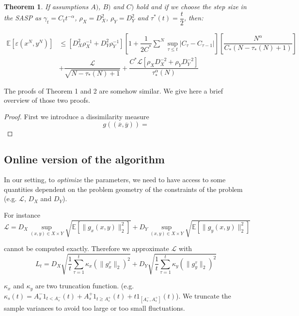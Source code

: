 \documentclass[12pt,reqno]{amsart}
\newtheorem{thm}{Theorem}[section]
\numberwithin{equation}{section}
\begin{document}
\begin{thm}
If assumptions $A)$, $B)$ and $C)$ hold and if we choose the step size in the SASP as $\gamma_{t} = C_{t}t^{-\alpha}$,
$\rho_{X} = D_{X}^{2}$, $\rho_{Y} = D_{Y}^{2}$ and $\tau^{*}(t) = \dfrac{t}{2}$, then:

\begin{align*}
\mathbb{E}[\varepsilon(x^{N},y^{N})] &\leq [D_{X}^{2}\rho_{X}^{-1} + D_{Y}^{2}\rho_{Y}^{-1} ][1 + \dfrac{1}{2C^{*}}\sum_{}^{N}\sup_{\tau \leq t} | C_{\tau} - C_{\tau-1}|]
[\dfrac{N^{\alpha}}{C_{*}(N - \tau_{*}(N) + 1)}] \\ 
&+ \dfrac{\mathcal{L}}{\sqrt{N - \tau_{*}(N)+ 1}} + \dfrac{C^{*}\mathcal{L}[\rho_{X}D_{X}^{-2} + \rho_{Y}D_{Y}^{-2}]}{\tau_{*}^{\alpha}(N)}
\end{align*}
\end{thm}


The proofs of Theorem 1 and 2 are somehow similar.
We give here a brief overview of those two proofs.

\begin{proof}

First we introduce a dissimilarity measure
$$
g((\overline{x},\overline{y})) = 
$$

\end{proof}

\subsection{Online version of the algorithm}

In our setting, to \emph{optimize} the parameters, we need to have access to some quantities dependent on the problem geometry of the constraints of the problem (e.g. $\mathcal{L}$, $D_{X}$ and $D_{Y}$).

For instance
$$
\mathcal{L} = D_{X} \sup_{(x,y) \in X \times Y} \sqrt{\mathbb{E}[\lVert g_{x}(x,y) \rVert_{2}^{2}]} + 
D_{Y} \sup_{(x,y) \in X \times Y} \sqrt{\mathbb{E}[\lVert g_{y}(x,y) \rVert_{2}^{2}]}
$$

cannot be computed exactly.
Therefore we approximate $\mathcal{L}$ with  
$$
L_{t} = D_{X}\sqrt{\dfrac{1}{t}\sum_{\tau=1}^{t}\kappa_{x}(\lVert g_{x}^{\tau} \rVert_{2})^{2}} + D_{Y}\sqrt{\dfrac{1}{t}\sum_{\tau=1}^{t}  \kappa_{y}(\lVert g_{y}^{\tau} \rVert_{2})^{2}}
$$

$\kappa_{x}$ and $\kappa_{y}$ are two truncation function.
(e.g. $\kappa_{s}(t) = A_{s}^{-}1_{ t < A_{s}^{-}}(t) + A_{s}^{+}1_{ t \geq A_{s}^{+}}(t) + t 1_{ [A_{s}^{-}, A_{s}^{+}]}(t)$).
We truncate the sample variances to avoid too large or too small fluctuations.
%
%
\end{document}
